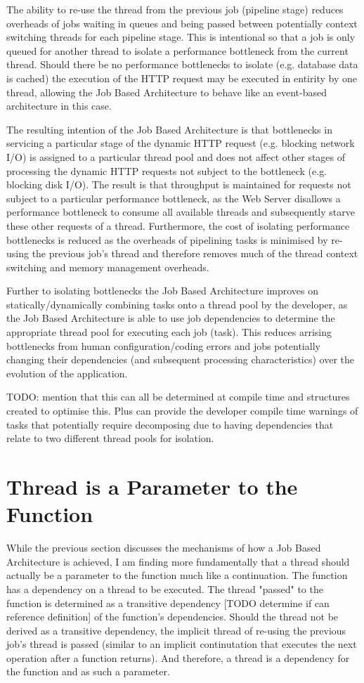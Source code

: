 \documentclass[conference]{ieee/IEEEtran}
\begin{document}
The ability to re-use the thread from the previous job (pipeline stage) reduces
overheads of jobs waiting in queues and being passed between potentially
context switching threads for each pipeline stage.  This is intentional so that
a job is only queued for another thread to isolate a performance bottleneck
from the current thread.  Should there be no performance bottlenecks to isolate
(e.g. database data is cached) the execution of the HTTP request may be
executed in entirity by one thread, allowing the Job Based Architecture to
behave like an event-based architecture in this case.

The resulting intention of the Job Based Architecture is that bottlenecks in
servicing a particular stage of the dynamic HTTP request (e.g. blocking network
I/O) is assigned to a particular thread pool and does not affect other stages of
processing the dynamic HTTP requests not subject to the bottleneck (e.g.
blocking disk I/O).  The result is that throughput is maintained for requests
not subject to a particular performance bottleneck, as the Web Server disallows
a performance bottleneck to consume all available threads and subsequently
starve these other requests of a thread.  Furthermore, the cost of isolating
performance bottlenecks is reduced as the overheads of pipelining tasks is
minimised by re-using the previous job's thread and therefore removes much of
the thread context switching and memory management overheads.

Further to isolating bottlenecks the Job Based Architecture improves on
statically/dynamically combining tasks onto a thread pool by the developer, as
the Job Based Architecture is able to use job dependencies to determine the
appropriate thread pool for executing each job (task).  This reduces arrising
bottlenecks from human configuration/coding errors and jobs potentially
changing their dependencies (and subsequent processing characteristics) over
the evolution of the application.

TODO: mention that this can all be determined at compile time and structures
created to optimise this.  Plus can provide the developer compile time warnings
of tasks that potentially require decomposing due to having dependencies that
relate to two different thread pools for isolation.


\section{Thread is a Parameter to the Function}
While the previous section discusses the mechanisms of how a Job Based
Architecture is achieved, I am finding more fundamentally that a thread should
actually be a parameter to the function much like a continuation.  The function
has a dependency on a thread to be executed.  The thread "passed" to the
function is determined as a transitive dependency [TODO determine if can
reference definition] of the function's dependencies.  Should the thread not be
derived as a transitive dependency, the implicit thread of re-using the
previous job's thread is passed (similar to an implicit continutation that
executes the next operation after a function returns).  And therefore, a thread
is a dependency for the function and as such a parameter.
\end{document}
